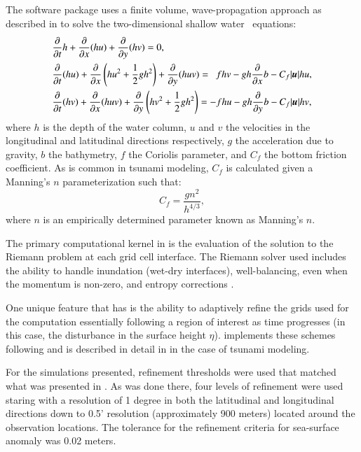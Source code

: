 \subsection{\geoclaw} \label{ssub:geoclaw}
The \geoclaw software package uses a finite volume, wave-propagation approach as
described in \cite{LeVeque:1997eg} to solve the two-dimensional shallow water \
equations:
\begin{equation} \label{eq:swe}
    \begin{aligned}
    &\pd{}{t} h + \pd{}{x} (hu) + \pd{}{y} (hv) = 0, \\
    &\pd{}{t}(hu) + \pd{}{x} \left(hu^2 + \frac{1}{2} g h^2 \right ) + \pd{}{y} (huv) = ~~ fhv - gh \pd{}{x} b - C_f |\vec{u}| hu, \\
    &\pd{}{t} (hv) + \pd{}{x} (huv) + \pd{}{y} \left (hv^2 + \frac{1}{2} gh^2 \right) = -fhu - gh \pd{}{y} b - C_f |\vec{u}| hv,
    \end{aligned}
\end{equation} 
where $h$ is the depth of the water column, $u$ and $v$ the velocities in the 
longitudinal and latitudinal directions respectively, $g$ the acceleration due 
to gravity, $b$ the bathymetry, $f$ the Coriolis parameter, and $C_f$ the bottom 
friction coefficient.  As is common in tsunami modeling, $C_f$ is calculated 
given a Manning's $n$ parameterization such that:
\begin{equation}
    C_f = \frac{g n^2}{h^{4/3}},
\label{eq:coef}
\end{equation}
where $n$ is an empirically determined parameter known as Manning's $n$.  

The primary computational kernel in \geoclaw is the evaluation of the solution
to the Riemann problem at each grid cell interface.  The Riemann solver used
includes the ability to handle inundation (wet-dry interfaces), well-balancing,
even when the momentum is non-zero, \alert{and entropy corrections}
\cite{George:2008aa}.

One unique feature that \geoclaw has is the ability to adaptively refine the
grids used for the computation essentially following a region of interest as
time progresses (in this case, the disturbance in the surface height $\eta$).
\geoclaw implements these schemes following \cite{Berger:1984ui,Berger:1998aa}
and is described in detail in \cite{Berger:2011du} in the case of tsunami
modeling.

For the simulations presented, refinement thresholds were used that matched what
was presented in \cite{MacInnes:2013cr}.  As was done there, four levels of
refinement were used staring with a resolution of 1 degree in both the
latitudinal and longitudinal directions down to 0.5' resolution (approximately
900 meters) located around the observation locations.  The tolerance for the
refinement criteria for sea-surface anomaly was 0.02 meters.

